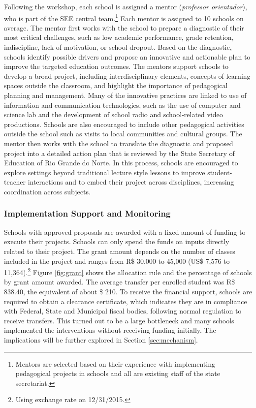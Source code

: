 \documentclass[11pt,a4paper]{article}
\begin{document}
	Following the workshop, each school is assigned a mentor (\textit{professor orientador}), who is part of the SEE central team.\footnote{Mentors are selected based on their experience with implementing pedagogical projects in schools and all are existing staff of the state secretariat.} Each mentor is assigned to 10 schools on average. The mentor first works with the school to prepare a diagnostic of their most critical challenges, such as low academic performance, grade retention, indiscipline, lack of motivation, or school dropout. Based on the diagnostic, schools identify possible drivers and propose an innovative and actionable plan to improve the targeted education outcomes. The mentors support schools to develop a broad project, including interdisciplinary elements, concepts of learning spaces outside the classroom, and highlight the importance of pedagogical planning and management. Many of the innovative practices are linked to use of information and communication technologies, such as the use of computer and science lab and the development of school radio and school-related video productions. Schools are also encouraged to include other pedagogical activities outside the school such as visits to local communities and cultural groups. The mentor then works with the school to translate the diagnostic and proposed project into a detailed action plan that is reviewed by the State Secretary of Education of Rio Grande do Norte. In this process, schools are encouraged to explore settings beyond traditional lecture style lessons to improve student-teacher interactions and to embed their project across disciplines, increasing coordination across subjects. 
	
	\subsubsection*{Implementation Support and Monitoring} \label{sec:implement}
	
	Schools with approved proposals are awarded with a fixed amount of funding to execute their projects. Schools can only spend the funds on inputs directly related to their project. The grant amount depends on the number of classes included in the project and ranges from R\$ 30,000 to 45,000 (US\$ 7,576 to 11,364).\footnote{Using exchange rate on 12/31/2015.} Figure \ref{fig:grant} shows the allocation rule and the percentage of schools by grant amount awarded. The average transfer per enrolled student was R\$ 838.40, the equivalent of about \$ 210. To receive the financial support, schools are required to obtain a clearance certificate, which indicates they are in compliance with Federal, State and Municipal fiscal bodies, following normal regulation to receive transfers. This turned out to be a large bottleneck and many schools implemented the interventions without receiving funding initially. The implications will be further explored in Section \ref{sec:mechanism}.
	
\end{document}
